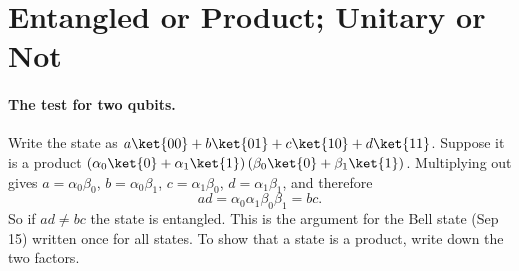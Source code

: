 \section{Entangled or Product; Unitary or Not}\label{sec:entangled}

\paragraph{The test for two qubits.}
Write the state as $a\ket{00} + b\ket{01} + c\ket{10} + d\ket{11}$. Suppose it is a product
$\left(\alpha_0\ket{0} + \alpha_1\ket{1}\right)\left(\beta_0\ket{0} + \beta_1\ket{1}\right)$.
Multiplying out gives $a = \alpha_0\beta_0$, $b = \alpha_0\beta_1$, $c = \alpha_1\beta_0$,
$d = \alpha_1\beta_1$, and therefore
\[ad = \alpha_0\alpha_1\beta_0\beta_1 = bc.\]
So if $ad \neq bc$ the state is entangled. This is the argument for the Bell state (Sep 15) written
once for all states. To show that a state is a product, write down the two factors.

